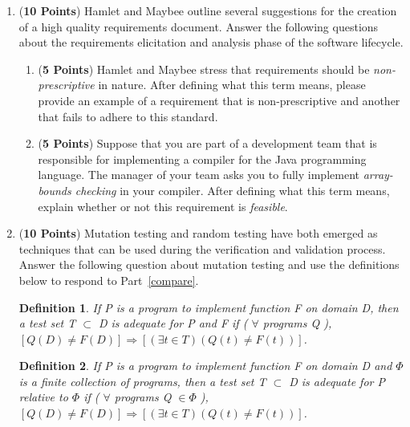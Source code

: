\documentclass[12pt,epsf,psfig,graphics]{article}
\newtheorem{define}{Definition}
\begin{document}
\begin{enumerate}
  
\item ({\bf 10 Points}) Hamlet and Maybee outline several suggestions
  for the creation of a high quality requirements document.  Answer
  the following questions about the requirements elicitation and
  analysis phase of the software lifecycle.

        \begin{enumerate}
          
        \item ({\bf 5 Points}) Hamlet and Maybee stress that
          requirements should be {\em non-prescriptive} in nature.
          After defining what this term means, please provide an
          example of a requirement that is non-prescriptive and
          another that fails to adhere to this standard.

        \item ({\bf 5 Points}) Suppose that you are part of a
          development team that is responsible for implementing a
          compiler for the Java programming language.  The manager of
          your team asks you to fully implement {\em array-bounds
            checking} in your compiler.  After defining what this term
          means, explain whether or not this requirement is {\em
            feasible}.

       \end{enumerate}
        
\newpage

\item ({\bf 10 Points}) Mutation testing and random testing have both
  emerged as techniques that can be used during the verification and
  validation process.  Answer the following question about mutation
  testing and use the definitions below to respond to
  Part~\ref{compare}.

\begin{define}

If P is a program to implement function F on domain D, then a test set
T $ \subset $ D is adequate for P and F if ( $\forall$ programs Q ),
$[Q(D) \neq F(D) ] \Rightarrow [(\exists t \in T) (Q(t) \neq F(t))]$.

\label{adeq}
\end{define}

\begin{define}

If P is a program to implement function F on domain D and $\Phi$ is a
finite collection of programs, then a test set T $ \subset $ D is
adequate for P relative to $\Phi$ if ( $\forall$ programs Q $\in \Phi$
), $[Q(D) \neq F(D) ] \Rightarrow [(\exists t \in T) (Q(t) \neq
  F(t))]$.


\end{define}
\end{enumerate}
\end{document}
